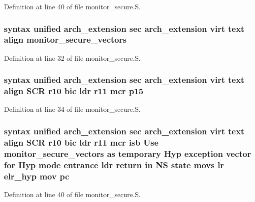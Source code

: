 \-Definition at line 40 of file monitor\-\_\-secure.\-S.

\hypertarget{monitor__secure_8_s_a4d354f7295ddc2f288384d4e03458837}{
\subsubsection[{monitor\-\_\-secure\-\_\-vectors}]{\setlength{\rightskip}{0pt plus 5cm}syntax unified arch\-\_\-extension sec arch\-\_\-extension virt text align {\bf monitor\-\_\-secure\-\_\-vectors}}}\label{monitor__secure_8_s_a4d354f7295ddc2f288384d4e03458837}


\-Definition at line 32 of file monitor\-\_\-secure.\-S.

\hypertarget{monitor__secure_8_s_a371ca5bf2f81d00215d5d65d975819b3}{
\subsubsection[{p15}]{\setlength{\rightskip}{0pt plus 5cm}syntax unified arch\-\_\-extension sec arch\-\_\-extension virt text align \-S\-C\-R {\bf r10} bic ldr {\bf r11} mcr {\bf p15}}}\label{monitor__secure_8_s_a371ca5bf2f81d00215d5d65d975819b3}


\-Definition at line 34 of file monitor\-\_\-secure.\-S.

\hypertarget{monitor__secure_8_s_a27468faba76ab3fb5458fb06c0f2af8a}{
\subsubsection[{pc}]{\setlength{\rightskip}{0pt plus 5cm}syntax unified arch\-\_\-extension sec arch\-\_\-extension virt text align \-S\-C\-R {\bf r10} bic ldr {\bf r11} mcr {\bf isb} \-Use {\bf monitor\-\_\-secure\-\_\-vectors} as temporary \-Hyp exception vector for \-Hyp mode entrance ldr {\bf return} in \-N\-S state movs {\bf lr} {\bf elr\-\_\-hyp} mov {\bf pc}}}\label{monitor__secure_8_s_a27468faba76ab3fb5458fb06c0f2af8a}


\-Definition at line 40 of file monitor\-\_\-secure.\-S.

